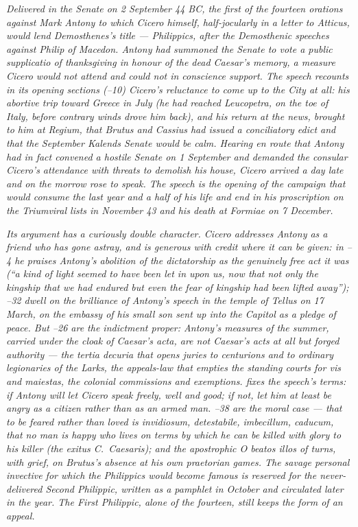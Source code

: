 
\textit{Delivered in the Senate on 2 September 44 BC, the first
of the fourteen orations against Mark Antony to which Cicero
himself, half-jocularly in a letter to Atticus, would lend
Demosthenes's title --- \textit{Philippics}, after the
Demosthenic speeches against Philip of Macedon. Antony had
summoned the Senate to vote a public \textit{supplicatio} of
thanksgiving in honour of the dead Caesar's memory, a measure
Cicero would not attend and could not in conscience support.
The speech recounts in its opening sections (--10)
Cicero's reluctance to come up to the City at all: his abortive
trip toward Greece in July (he had reached Leucopetra, on the
toe of Italy, before contrary winds drove him back), and his
return at the news, brought to him at Regium, that Brutus and
Cassius had issued a conciliatory edict and that the September
Kalends Senate would be calm. Hearing en route that Antony had
in fact convened a hostile Senate on 1 September and demanded
the consular Cicero's attendance with threats to demolish his
house, Cicero arrived a day late and on the morrow rose to
speak. The speech is the opening of the campaign that would
consume the last year and a half of his life and end in his
proscription on the Triumviral lists in November 43 and his
death at Formiae on 7 December.}

\textit{Its argument has a curiously double character. Cicero
addresses Antony as a friend who has gone astray, and is
generous with credit where it can be given: in --4 he praises Antony's abolition of the dictatorship as the
genuinely free act it was (``a kind of light seemed to have
been let in upon us, now that not only the kingship that we
had endured but even the fear of kingship had been lifted
away''); --32 dwell on the brilliance of
Antony's speech in the temple of Tellus on 17 March, on the
embassy of his small son sent up into the Capitol as a pledge
of peace. But --26 are the indictment proper:
Antony's measures of the summer, carried under the cloak of
Caesar's \textit{acta}, are not Caesar's acts at all but
forged authority --- the \textit{tertia decuria} that opens
juries to centurions and to ordinary legionaries of the
Larks, the appeals-law that empties the standing courts for
\textit{vis} and \textit{maiestas}, the colonial commissions
and exemptions.  fixes the speech's terms: if
Antony will let Cicero speak freely, well and good; if not,
let him at least be angry as a citizen rather than as an
armed man. --38 are the moral case --- that to
be feared rather than loved is \textit{invidiosum,
detestabile, imbecillum, caducum}, that no man is happy who
lives on terms by which he can be killed with glory to his
killer (the \textit{exitus C.~Caesaris}); and the apostrophic
\textit{O beatos illos} of  turns, with grief,
on Brutus's absence at his own praetorian games. The savage
personal invective for which the \textit{Philippics} would
become famous is reserved for the never-delivered Second
Philippic, written as a pamphlet in October and circulated
later in the year. The First Philippic, alone of the
fourteen, still keeps the form of an appeal.}

